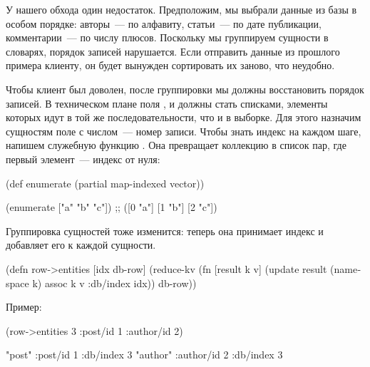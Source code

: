 
У нашего обхода один недостаток. Предположим, мы выбрали данные из базы в особом порядке: авторы~--- по алфавиту, статьи~--- по дате публикации, комментарии~--- по числу плюсов. Поскольку мы группируем сущности в словарях, порядок записей нарушается. Если отправить данные из прошлого примера клиенту, он будет вынужден сортировать их заново, что неудобно.

Чтобы клиент был доволен, после группировки мы должны восстановить порядок записей. В техническом плане поля ,  и  должны стать списками, элементы которых идут в той же последовательности, что и в выборке. Для этого назначим сущностям поле  с числом~--- номер записи. Чтобы знать индекс на каждом шаге, напишем служебную функцию . Она превращает коллекцию в список пар, где первый элемент~--- индекс от нуля:

\begin{english}
  \begin{clojure}
(def enumerate
  (partial map-indexed vector))

(enumerate ["a" "b" "c"])
;; ([0 "a"] [1 "b"] [2 "c"])
  \end{clojure}
\end{english}

Группировка сущностей тоже изменится: теперь она принимает индекс и добавляет его к каждой сущности.

\begin{english}
  \begin{clojure}
(defn row->entities [idx db-row]
  (reduce-kv
   (fn [result k v]
     (update result
             (namespace k)
             assoc
             k v
             :db/index idx))
   {}
   db-row))
  \end{clojure}
\end{english}

Пример:

\begin{english}
  \begin{clojure}
(row->entities 3 {:post/id 1 :author/id 2})

{"post" {:post/id 1 :db/index 3}
 "author" {:author/id 2 :db/index 3}}
  \end{clojure}
\end{english}


